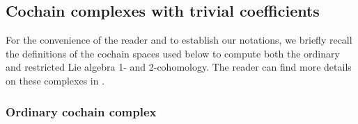 \documentclass[10pt,a4paper]{amsart}
\numberwithin{equation}{section}
\begin{document}
\subsection{Cochain complexes with trivial coefficients}

For the convenience of the reader and to establish our notations, we
briefly recall the definitions of the cochain spaces used below to
compute both the ordinary and restricted Lie algebra 1- and
2-cohomology. The reader can find more details on these complexes in
\cite{ChevalleyEilenberg1948,EvFi2017,EvFi2019,FuchsBook,Hochschild1954}.

\subsubsection{Ordinary cochain complex}
\end{document}
